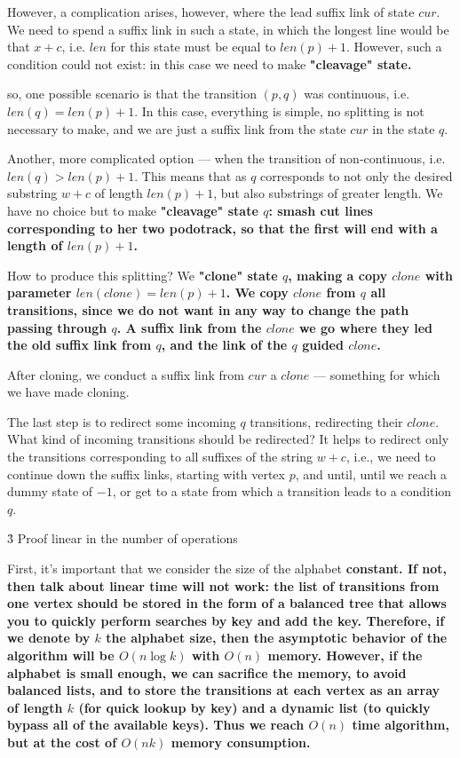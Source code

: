 {However, a complication arises, however, where the lead suffix link of state $cur$. We need to spend a suffix link in such a state, in which the longest line would be that $x+c$, i.e. $len$ for this state must be equal to $len(p) + 1$. However, such a condition could not exist: in this case we need to make \bf{"cleavage"} state.

\li so, one possible scenario is that the transition $(p,q)$ was continuous, i.e. $len(q) = len(p) + 1$. In this case, everything is simple, no splitting is not necessary to make, and we are just a suffix link from the state $cur$ in the state $q$.

\li Another, more complicated option --- when the transition of non-continuous, i.e. $len(q) > len(p) + 1$. This means that as $q$ corresponds to not only the desired substring $w+c$ of length $len(p) + 1$, but also substrings of greater length. We have no choice but to make \bf{"cleavage"} state $q$: smash cut lines corresponding to her two podotrack, so that the first will end with a length of $len(p) + 1$.

How to produce this splitting? We \bf{"clone"} state $q$, making a copy $clone$ with parameter $len(clone) = len(p) + 1$. We copy $clone$ from $q$ all transitions, since we do not want in any way to change the path passing through $q$. A suffix link from the $clone$ we go where they led the old suffix link from $q$, and the link of the $q$ guided $clone$.

After cloning, we conduct a suffix link from $cur$ a $clone$ --- something for which we have made cloning.

The last step is to redirect some incoming $q$ transitions, redirecting their $clone$. What kind of incoming transitions should be redirected? It helps to redirect only the transitions corresponding to all suffixes of the string $w+c$, i.e., we need to continue down the suffix links, starting with vertex $p$, and until, until we reach a dummy state of $-1$, or get to a state from which a transition leads to a condition $q$.

}


\h3{ Proof linear in the number of operations }

First, it's important that we consider the size of the alphabet \bf{constant}. If not, then talk about linear time will not work: the list of transitions from one vertex should be stored in the form of a balanced tree that allows you to quickly perform searches by key and add the key. Therefore, if we denote by $k$ the alphabet size, then the asymptotic behavior of the algorithm will be $O (n \log k)$ with $O (n)$ memory. However, if the alphabet is small enough, we can sacrifice the memory, to avoid balanced lists, and to store the transitions at each vertex as an array of length $k$ (for quick lookup by key) and a dynamic list (to quickly bypass all of the available keys). Thus we reach $O(n)$ time algorithm, but at the cost of $O (n k)$ memory consumption.

